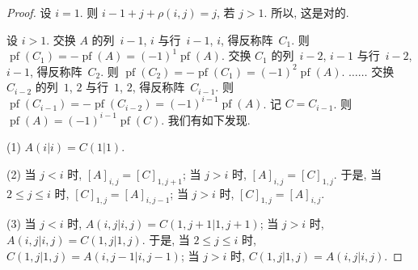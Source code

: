 \begin{proof}
    设 \(i = 1\).
    则 \(i - 1 + j + \rho(i, j) = j\), 若 \(j > 1\).
    所以, 这是对的.

    设 \(i > 1\).
    交换 \(A\) 的列~\(i-1\), \(i\) 与行~\(i-1\), \(i\),
    得反称阵~\(C_1\).
    则 \(\operatorname{pf} {(C_1)}
    = -\operatorname{pf} {(A)}
    = (-1)^1 \operatorname{pf} {(A)}\).
    交换 \(C_1\) 的列~\(i-2\), \(i-1\) 与行~\(i-2\), \(i-1\),
    得反称阵~\(C_2\).
    则 \(\operatorname{pf} {(C_2)}
    = -\operatorname{pf} {(C_1)}
    = (-1)^2 \operatorname{pf} {(A)}\).
    \(\dots \dots\)
    交换 \(C_{i-2}\) 的列~\(1\), \(2\) 与行~\(1\), \(2\),
    得反称阵~\(C_{i-1}\).
    则 \(\operatorname{pf} {(C_{i-1})}
    = -\operatorname{pf} {(C_{i-2})}
    = (-1)^{i-1} \operatorname{pf} {(A)}\).
    记 \(C = C_{i-1}\).
    则 \(\operatorname{pf} {(A)}
    = (-1)^{i-1} \operatorname{pf} {(C)}\).
    我们有如下发现.

    (1)
    \(A(i|i) = C(1|1)\).

    (2)
    当 \(j < i\) 时,
    \([A]_{i,j} = [C]_{1,j+1}\);
    当 \(j > i\) 时,
    \([A]_{i,j} = [C]_{1,j}\).
    于是,
    当 \(2 \leq j \leq i\) 时,
    \([C]_{1,j} = [A]_{i,j-1}\);
    当 \(j > i\) 时,
    \([C]_{1,j} = [A]_{i,j}\).

    (3)
    当 \(j < i\) 时,
    \(A({i,j}|{i,j}) = C({1,j+1}|{1,j+1})\);
    当 \(j > i\) 时,
    \(A({i,j}|{i,j}) = C({1,j}|{1,j})\).
    于是,
    当 \(2 \leq j \leq i\) 时,
    \(C({1,j}|{1,j}) = A({i,j-1}|{i,j-1})\);
    当 \(j > i\) 时,
    \(C({1,j}|{1,j}) = A({i,j}|{i,j})\).


\end{proof}

